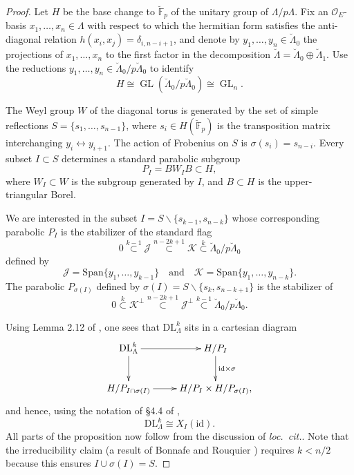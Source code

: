 \documentclass[11pt]{alggeom}
\newcommand{\iso}{\cong}
\newcommand{\F}{\mathbb F}
\newcommand{\co}{\mathcal O}
\DeclareMathOperator{\GL}{GL}
\begin{document}
\begin{proof}
Let $H$ be the base change to $\breve{\F}_p$ of the unitary group of $\Lambda/p\Lambda$.
Fix an $\co_E$-basis $x_1,\ldots, x_n \in \Lambda$ with respect to which the hermitian form satisfies the anti-diagonal relation $h(x_i,x_j) = \delta_{i, n-i+1}$, and denote by
$
y_1,\ldots, y_n \in \breve{\Lambda}_0
$
the projections of $x_1,\ldots, x_n$ to the first factor in the decomposition $\breve{\Lambda}=\breve{\Lambda}_0\oplus \breve{\Lambda}_1$.
Use the reductions  $y_1,\ldots, y_n \in \breve{\Lambda}_0/p\breve{\Lambda}_0$  to identify
\[
H \iso \GL(\breve{\Lambda}_0/p\breve{\Lambda}_0) \iso \GL_n.
\]


The Weyl group $W$ of the diagonal torus is generated by the set of simple reflections $S=\{ s_1,\ldots, s_{n-1} \}$,  where $s_i \in  H(\breve{\F}_p)$ is the transposition matrix interchanging $y_i \leftrightarrow y_{i+1}$.  The action of Frobenius on $S$ is 
$
\sigma(s_i) = s_{n-i}.
$
Every subset $I\subset S$ determines a standard parabolic subgroup 
\[
P_I = B W_I B \subset H,
\]
where $W_I \subset W$ is the subgroup generated by $I$, and $B\subset H$ is the upper-triangular Borel.  


We are interested in the subset
$
I  = S \smallsetminus \{ s_{k-1},  s_{n-k} \}
$
whose corresponding parabolic $P_I$ is the stabilizer of the standard flag 
\[
0 \stackrel{k-1}{\subset}  \mathscr{J} 
\stackrel{n-2k+1}{\subset}      \mathscr{K} \stackrel{k}{\subset}
 \breve{\Lambda}_0 / p  \breve{\Lambda}_0
\]
defined by
\[
\mathscr{J} = \mathrm{Span}\{ y_1,\ldots, y_{k-1} \} 
\quad \mbox{and} \quad
\mathscr{K} = \mathrm{Span}\{ y_1,\ldots, y_{n-k} \} .
\]
The parabolic $P_{\sigma(I)}$ defined by $\sigma(I) = S \smallsetminus \{ s_k , s_{n-k+1} \}$ is the stabilizer of 
\[
0 \stackrel{k}{\subset}   \mathscr{K}^\perp 
\stackrel{n-2k+1}{\subset}     \mathscr{J}^\perp \stackrel{k-1}{\subset}
 \breve{\Lambda}_0 / p  \breve{\Lambda}_0.
\]

Using Lemma 2.12 of \cite{Vollaard}, one sees that   $\mathrm{DL}_\Lambda^k$ sits in a cartesian diagram
\[
\xymatrix{
{  \mathrm{DL}_\Lambda^k }   \ar[r] \ar[d]  & {   H / P_I    }  \ar[d]^{\mathrm{id} \times \sigma}   \\
{   H / P_{ I \cap \sigma(I) }    }  \ar[r]  &  {     H / P_I   \times   H / P_{  \sigma(I) } ,} 
}
\]
and hence, using the notation of \S 4.4 of \cite{VollaardWedhorn},  
\[
\mathrm{DL}_\Lambda^k \iso X_I( \mathrm{id} ).
\]
All parts of the proposition now follow from the discussion of \emph{loc.~cit.}.  
Note that the irreducibility claim (a result of Bonnafe and Rouquier \cite{BR}) requires $k<n/2$ because this ensures   $I \cup   \sigma  (I) = S$.
\end{proof}
\end{document}
